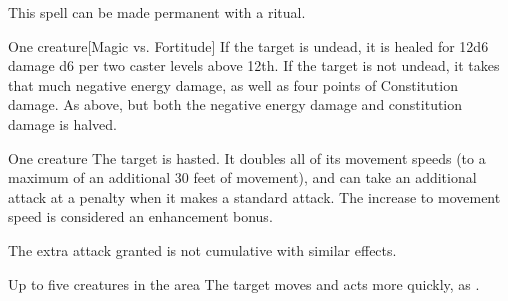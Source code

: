 This spell can be made permanent with a  ritual.

\begin{comment}
\subsubsection{H}
\end{comment}

\spellrng{\rngclose}
\begin{spelltarget}{One creature}[Magic vs. Fortitude]
    \spelleffect If the target is undead, it is healed for 12d6 damage \add d6 per two caster levels above 12th.
    \spellsuccess If the target is not undead, it takes that much negative energy damage, as well as four points of Constitution damage.
    \spellfailure As above, but both the negative energy damage and constitution damage is halved.
\end{spelltarget}

\spelldur{\durshort}
\begin{spelltarget}{One creature}
    \spelleffect The target is hasted. It doubles all of its movement speeds (to a maximum of an additional 30 feet of movement), and can take an additional attack at a  penalty when it makes a standard attack. The increase to movement speed is considered an enhancement bonus.
\end{spelltarget}
\spellnotes The extra attack granted is not cumulative with similar effects.

\begin{spelltargets}{Up to five creatures in the area}
    \spelleffect The target moves and acts more quickly, as .
\end{spelltargets}

